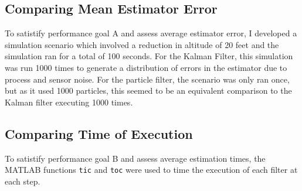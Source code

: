 \subsection{Comparing Mean Estimator Error}

To satistify performance goal A and assess average estimator error, I
developed a simulation scenario which involved a reduction in altitude of 20
feet and the simulation ran for a total of 100 seconds. For the Kalman
Filter, this simulation was run 1000 times to generate a
distribution of errors in the estimator due to process and sensor
noise. For the particle filter, the scenario was only ran once, but as
it used 1000 particles, this seemed to be an equivalent comparison to
the Kalman filter executing 1000 times.

\subsection{Comparing Time of Execution}

To satistify performance goal B and assess average estimation times,
the MATLAB functions \texttt{tic} and \texttt{toc} were used to time the
execution of each filter at each step. 
